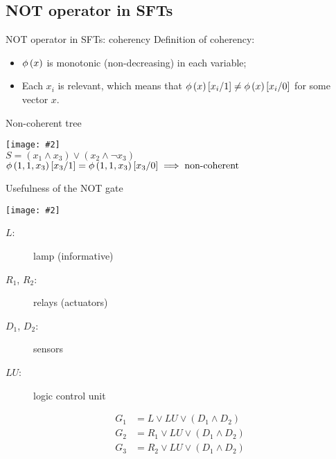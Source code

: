 \documentclass{beamer}
\newcommand{\includegraphicsaspectratio}[2][1]{%
  \texttt{[image: \#2]}%
}
\def\ftcoherencyop{\ensuremath\operatorname{\phi}}
\newcommand{\ftcoherency}[1]{\ensuremath\ftcoherencyop\left(#1\right)}
\newcommand{\replace}[2]{\ensuremath\left[#1\middle/#2\right]}
\begin{document}
\subsection{NOT operator in SFTs}

\begin{frame}{NOT operator in SFTs: coherency}
	Definition of coherency:
	\begin{itemize}
		\item $\ftcoherency{x}$ is monotonic (non-decreasing) in each variable;
		\item Each $x_i$ is relevant, which means that $\ftcoherency{x}\replace{x_i}{1} \neq \ftcoherency{x}\replace{x_i}{0}$ for some vector $x$.
	\end{itemize}
\end{frame}

\begin{frame}{Non-coherent tree}
	\begin{center}
		\includegraphicsaspectratio[0.55]{non-coherent-ft-example}\\
		$S = \left(x_1 \land x_3\right) \lor \left(x_2 \land \lnot x_3\right)$\\
		$\ftcoherency{1,1,x_3}\replace{x_3}{1}=\ftcoherency{1,1,x_3}\replace{x_3}{0} \implies \text{non-coherent}$
	\end{center}
\end{frame}

\begin{frame}{Usefulness of the NOT gate}
	\begin{center}
		\begin{minipage}{0.6\textwidth}
			\includegraphicsaspectratio[1]{ft-generic-failure-gas-detection-system}
		\end{minipage}
		\begin{minipage}{0.39\textwidth}
			\footnotesize
			\begin{description}
				\item[$L$:] lamp (informative)
				\item[$R_1$, $R_2$:] relays (actuators)
				\item[$D_1$, $D_2$:] sensors
				\item[$LU$:] logic control unit
			\end{description}
			\begin{align*}
				G_1 & = L \lor LU \lor \left(D_1 \land D_2\right)\\
				G_2 & = R_1 \lor LU \lor \left(D_1 \land D_2\right)\\
				G_3 & = R_2 \lor LU \lor \left(D_1 \land D_2\right)
			\end{align*}
		\end{minipage}
	\end{center}
\end{frame}
\end{document}
